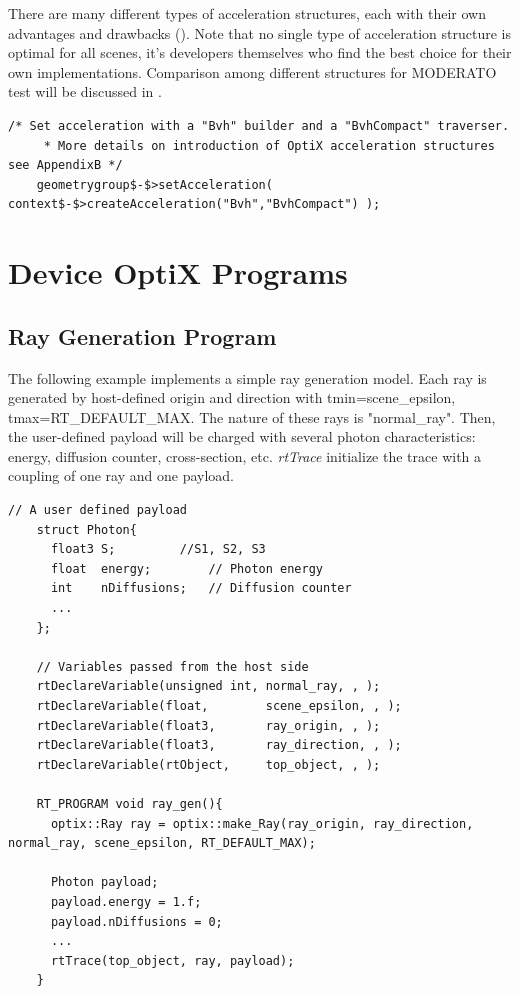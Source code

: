There are many different types of acceleration structures, each with their own advantages and drawbacks (). Note that no single type of acceleration structure is optimal for all scenes, it's developers themselves who find the best choice for their own implementations. Comparison among different structures for MODERATO test will be discussed in .
\begin{lstlisting}[mathescape]
    /* Set acceleration with a "Bvh" builder and a "BvhCompact" traverser.
     * More details on introduction of OptiX acceleration structures see AppendixB */
    geometrygroup$-$>setAcceleration( context$-$>createAcceleration("Bvh","BvhCompact") );
\end{lstlisting}

\section{Device OptiX Programs}
\label{device}

\subsection{Ray Generation Program}
The following example implements a simple ray generation model. Each ray is generated by host-defined origin and direction with tmin=scene\_epsilon, tmax=RT\_DEFAULT\_MAX. The nature of these rays is "normal\_ray". Then, the user-defined payload will be charged with several photon characteristics: energy, diffusion counter, cross-section, etc. \textit{rtTrace} initialize the trace with a coupling of one ray and one payload.
\begin{lstlisting}[mathescape]
    // A user defined payload
    struct Photon{
      float3 S;			//S1, S2, S3
      float  energy;		// Photon energy
      int    nDiffusions;	// Diffusion counter
      ...
    };
    
    // Variables passed from the host side
    rtDeclareVariable(unsigned int,	normal_ray, , );
    rtDeclareVariable(float,		scene_epsilon, , );
    rtDeclareVariable(float3,		ray_origin, , );
    rtDeclareVariable(float3,		ray_direction, , );
    rtDeclareVariable(rtObject,		top_object, , );
    
    RT_PROGRAM void ray_gen(){   
      optix::Ray ray = optix::make_Ray(ray_origin, ray_direction, normal_ray, scene_epsilon, RT_DEFAULT_MAX);
      
      Photon payload;
      payload.energy = 1.f;
      payload.nDiffusions = 0;
      ...
      rtTrace(top_object, ray, payload);
    }
\end{lstlisting}

